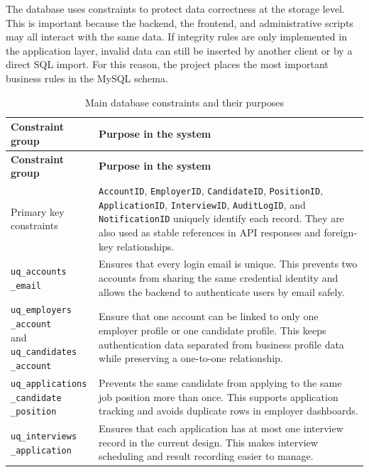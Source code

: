 \documentclass[12pt,a4paper]{report}
\makeatletter
\newcommand{\codebreak}[1]{\begin{tabular}[t]{@{}l@{}}#1\end{tabular}}
\makeatother
\begin{document}
The database uses constraints to protect data correctness at the storage level. This is important because the backend, the frontend, and administrative scripts may all interact with the same data. If integrity rules are only implemented in the application layer, invalid data can still be inserted by another client or by a direct SQL import. For this reason, the project places the most important business rules in the MySQL schema.

\begin{longtable}{L{0.27\textwidth}L{0.63\textwidth}}
\caption{Main database constraints and their purposes}
\label{tab:constraints}\\
\toprule
\textbf{Constraint group} & \textbf{Purpose in the system} \\
\midrule
\endfirsthead
\toprule
\textbf{Constraint group} & \textbf{Purpose in the system} \\
\midrule
\endhead
\codebreak{Primary key\\constraints} & \texttt{AccountID}, \texttt{EmployerID}, \texttt{CandidateID}, \texttt{PositionID}, \texttt{ApplicationID}, \texttt{InterviewID}, \texttt{AuditLogID}, and \texttt{NotificationID} uniquely identify each record. They are also used as stable references in API responses and foreign-key relationships. \\
\codebreak{\texttt{uq\_accounts}\\\texttt{\_email}} & Ensures that every login email is unique. This prevents two accounts from sharing the same credential identity and allows the backend to authenticate users by email safely. \\
\codebreak{\texttt{uq\_employers}\\\texttt{\_account}\\and\\\texttt{uq\_candidates}\\\texttt{\_account}} & Ensure that one account can be linked to only one employer profile or one candidate profile. This keeps authentication data separated from business profile data while preserving a one-to-one relationship. \\
\codebreak{\texttt{uq\_applications}\\\texttt{\_candidate}\\\texttt{\_position}} & Prevents the same candidate from applying to the same job position more than once. This supports application tracking and avoids duplicate rows in employer dashboards. \\
\codebreak{\texttt{uq\_interviews}\\\texttt{\_application}} & Ensures that each application has at most one interview record in the current design. This makes interview scheduling and result recording easier to manage. \\

\end{longtable}
\end{document}
